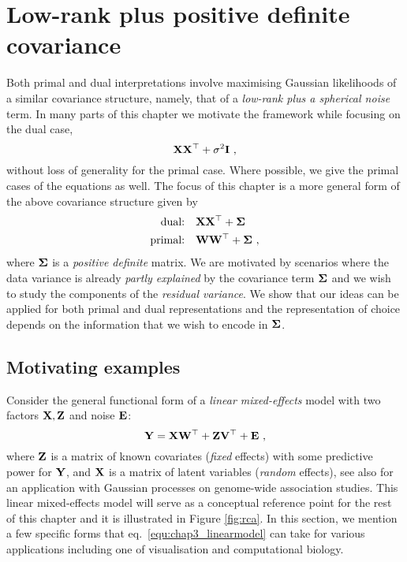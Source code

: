     \section{Low-rank plus positive definite covariance} \label{sec:chap3_LRPDcovariance}
      Both primal and dual interpretations involve maximising Gaussian likelihoods of a similar covariance structure, namely, that of a \textit{low-rank plus a spherical noise} term.
      In many parts of this chapter we motivate the framework while focusing on the dual case,
      \[
	\mathbf{X}\mathbf{X}^\top + \sigma^2\mathbf{I} ~,
      \]      
      without loss of generality for the primal case.
      Where possible, we give the primal cases of the equations as well.
      The focus of this chapter is a more general form of the above covariance structure given by
      \begin{align}
	\textrm{dual:} \quad &\mathbf{X}\mathbf{X}^\top + \mathbf{\Sigma} \\
	\textrm{primal:} \quad &\mathbf{W}\mathbf{W}^\top + \mathbf{\Sigma} ~,
      \end{align}
      where $\mathbf{\Sigma}$ is a \emph{positive definite} matrix. We are motivated by scenarios where the data variance is already \emph{partly explained} by the covariance term $\mathbf{\Sigma}$ and we wish to study the components of the \emph{residual variance}. We show that our ideas can be applied for both primal and dual representations and the representation of choice depends on the information that we wish to encode in $\mathbf{\Sigma}$.


    \subsection{Motivating examples} \label{subsec:chap3_motivation}
      Consider the general functional form of a \textit{linear mixed-effects} model \citep{Pinheiro:mixed2000} with two factors $\mathbf{X}, \mathbf{Z}$ and noise $\mathbf{E}$: %
      \begin{equation} \label{equ:chap3_linearmodel}
	\mathbf{Y} = \mathbf{X}\mathbf{W}^\top + \mathbf{Z}\mathbf{V}^\top + \mathbf{E} ~,
      \end{equation}
      where $\mathbf{Z}$ is a matrix of known covariates (\textit{fixed} effects) with some predictive power for $\mathbf{Y}$, and $\mathbf{X}$ is a matrix of latent variables (\textit{random} effects), see also \citep{Fusi:genomics12} for an application with Gaussian processes on genome-wide association studies.
      This linear mixed-effects model will serve as a conceptual reference point for the rest of this chapter and it is illustrated in Figure \ref{fig:rca}. In this section, we mention a few specific forms that eq.~\eqref{equ:chap3_linearmodel} can take for various applications including one of visualisation and computational biology.
      
